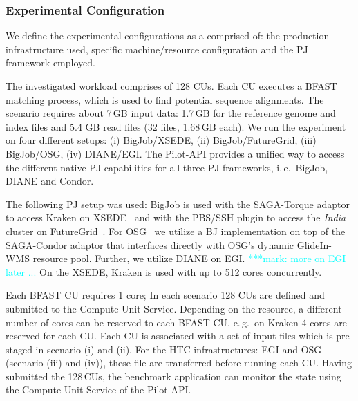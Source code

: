 \documentclass[conference,final]{IEEEtran}
\newcommand{\onote}[1]{ {\textcolor{cyan} { (***Ole: #1) }}}
\newcommand{\jhanote}[1]{ {\textcolor{red} { ***shantenu: #1 }}}
\newcommand{\msnote}[1]{ {\textcolor{cyan} { ***mark: #1 }}}
\newcommand{\onote}[1]{}
\newcommand{\jhanote}[1]{}
\newcommand{\msnote}[1]{}
\newcommand{\cu}{CU\xspace}
\newcommand{\cus}{CUs\xspace}
\begin{document}

\subsubsection*{Experimental Configuration}


We define the experimental configurations as a comprised
of: the production infrastructure used, specific machine/resource 
configuration and the PJ framework employed.

The investigated workload comprises of 128 \cus. Each \cu executes a
BFAST matching process, which is used to find potential sequence
alignments. The scenario requires about 7\,GB input data: 1.7\,GB for
the reference genome and index files and 5.4 GB read files (32 files,
1.68\,GB each). We run the experiment on four different setups: (i)
BigJob/XSEDE, (ii) BigJob/FutureGrid, (iii) BigJob/OSG, (iv)
DIANE/EGI.  The Pilot-API provides a unified way to access the
different native PJ capabilities for all three PJ frameworks, i.\,e.\
BigJob, DIANE and Condor.





The following PJ setup was used: BigJob is used with the SAGA-Torque
adaptor to access Kraken on XSEDE~\cite{xsede} and with the PBS/SSH
plugin to access the \textit{India} cluster on
FutureGrid~\cite{fg}. For OSG~\cite{1742-6596-78-1-012057} we utilize
a BJ implementation on top of the SAGA-Condor adaptor that interfaces
directly with OSG's dynamic GlideIn-WMS resource pool.  Further, we
utilize DIANE on EGI.  \msnote{more on EGI later ...} On the XSEDE,
Kraken is used with up to 512 cores concurrently.


Each BFAST \cu requires 1 core; In each scenario 128 \cus are defined and
submitted to the Compute Unit Service. Depending on the resource, a
different number of cores can be reserved to each BFAST \cu,
e.\,g.\ on Kraken 4 cores are reserved for each \cu. Each \cu is
associated with a set of input files which is pre-staged in scenario (i)
and (ii). For the HTC infrastructures: EGI and OSG (scenario (iii) and
(iv)), these file are transferred before running each \cu. 
Having submitted the 128\,\cus,
the benchmark application can monitor the state using the Compute Unit
Service of the Pilot-API.
\end{document}
